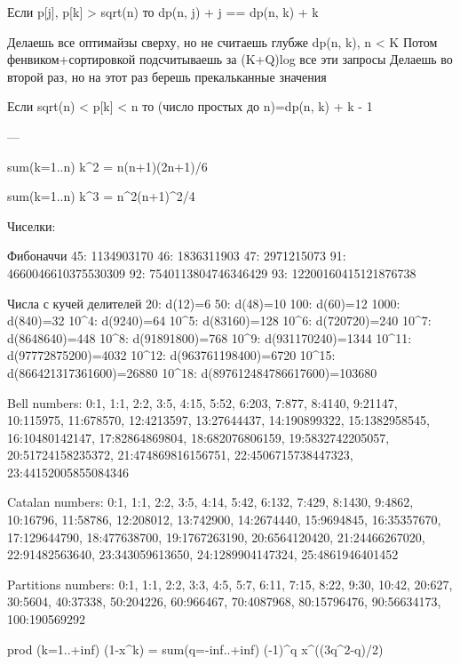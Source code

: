 Если p[j], p[k] > sqrt(n) то dp(n, j) + j == dp(n, k) + k

Делаешь все оптимайзы сверху, но не считаешь глубже dp(n, k), n < K
Потом фенвиком+сортировкой подсчитываешь за (K+Q)log все эти запросы
Делаешь во второй раз, но на этот раз берешь прекальканные значения

Если sqrt(n) < p[k] < n то (число простых до n)=dp(n, k) + k - 1

---

sum(k=1..n) k^2 = n(n+1)(2n+1)/6

sum(k=1..n) k^3 = n^2(n+1)^2/4


Чиселки: 

Фибоначчи
45:  1134903170
46:  1836311903
47:  2971215073
91:  4660046610375530309
92:  7540113804746346429
93:  12200160415121876738

Числа с кучей делителей
20: d(12)=6
50: d(48)=10
100: d(60)=12
1000: d(840)=32
10^4: d(9240)=64
10^5: d(83160)=128
10^6: d(720720)=240
10^7: d(8648640)=448
10^8: d(91891800)=768
10^9: d(931170240)=1344
10^{11}: d(97772875200)=4032
10^{12}: d(963761198400)=6720
10^{15}: d(866421317361600)=26880
10^{18}: d(897612484786617600)=103680

Bell numbers:
0:1, 1:1, 2:2, 3:5, 4:15, 5:52, 6:203, 7:877, 8:4140, 9:21147,
10:115975, 11:678570, 12:4213597, 13:27644437, 14:190899322,
15:1382958545, 16:10480142147, 17:82864869804, 18:682076806159,
19:5832742205057, 20:51724158235372, 21:474869816156751,
22:4506715738447323, 23:44152005855084346

Catalan numbers:
0:1, 1:1, 2:2, 3:5, 4:14, 5:42, 6:132, 7:429, 8:1430, 9:4862,
10:16796, 11:58786, 12:208012, 13:742900, 14:2674440,
15:9694845, 16:35357670, 17:129644790, 18:477638700,
19:1767263190, 20:6564120420, 21:24466267020, 22:91482563640,
23:343059613650, 24:1289904147324, 25:4861946401452

Partitions numbers:
0:1, 1:1, 2:2, 3:3, 4:5, 5:7, 6:11, 7:15, 8:22, 9:30, 10:42, 20:627, 30:5604, 40:37338, 50:204226, 60:966467, 70:4087968, 80:15796476, 90:56634173, 100:190569292

prod (k=1..+inf) (1-x^k) = sum(q=-inf..+inf) (-1)^q x^((3q^2-q)/2)
